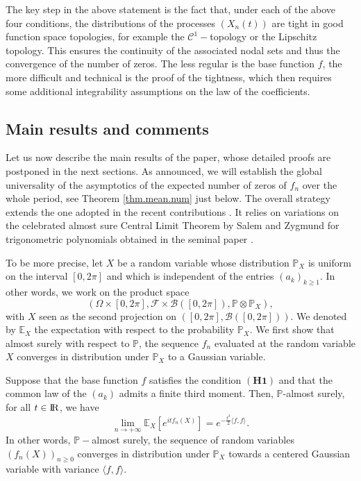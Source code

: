 \documentclass{svproc}
\newcommand{\Prob}{\mathbb{P}}
\newcommand \Esp {\mathbb{E}}
\def\R{{\rm I\kern-0.16em R}}
\begin{document}
The key step in the above statement is the fact that, under each of the above four conditions, the distributions of the processes $(X_n(t))$ are tight in good function space topologies, for example the $\mathcal C^1-$topology or the Lipschitz topology. This ensures the continuity of the associated nodal sets and thus the convergence of the number of zeros. The less regular is the base function $f$, the more difficult and technical is the proof of the tightness, which then requires some additional integrability assumptions on the law of the coefficients.



\subsection{Main results and comments} \label{sec.mainresults}

Let us now describe the main results of the paper, whose detailed proofs are postponed in the next sections. As announced, we will establish the global universality of the asymptotics of the expected number of zeros of $f_n$ over the whole period, see Theorem \ref{thm.mean.num} just below. The overall strategy extends the one adopted in the recent contributions \cite{AP21,APP22,AP23}. It relies on variations on the celebrated almost sure Central Limit Theorem by Salem and Zygmund for trigonometric polynomials obtained in the seminal paper \cite{SZ54}.
\par
\medskip
To be more precise, let $X$ be a random variable whose distribution $\mathbb P_X$ is uniform on the interval $[0,2\pi]$ and which is independent of the entries $(a_k)_{k\geq 1}$. In other words, we work on the product space
$$\left(\Omega \times [0,2\pi], \mathcal{F} \times \mathcal{B}([0,2\pi]),\Prob\otimes \Prob_X\right),$$
with $X$ seen as the second projection on $([0,2\pi],\mathcal{B}([0,2\pi]))$.
We denoted by $\Esp_{X}$ the expectation with respect to the probability $\Prob_X$. 
We first show that almost surely with respect to $\mathbb P$, the sequence $f_n$ evaluated at the random variable $X$ converges in distribution under $\mathbb P_X$ to a Gaussian variable. 

\begin{theorem}\label{thm.salem.func.gen}
Suppose that the base function $f$ satisfies the condition $\mathbf{(H1)}$ and that the common law of the $(a_k)$ admits a finite third moment. Then, $\Prob$-almost surely, for all $t \in \R$, we have
\[
\lim_{n\to +\infty} \Esp_X\left[e^{itf_n(X)}\right]= e^{-\frac{t^2}{2}\langle f,f \rangle}.
\]
In other words, $\Prob-$almost surely, the sequence of random variables $(f_n(X))_{n\geq 0}$ converges in distribution under $\Prob_X$ towards a {centered} Gaussian variable {with variance $\langle f,f \rangle$}.
\end{theorem}
\end{document}
